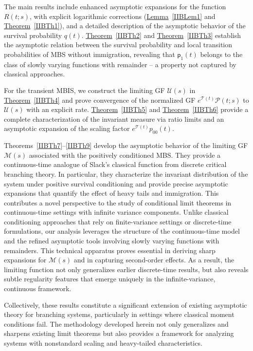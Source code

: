 \documentclass[10pt,reqno]{amsart}
\theoremstyle{definition}
\numberwithin{equation}{section}
\begin{document}
    The main results include enhanced asymptotic expansions for the function $R(t;s)$, with explicit logarithmic
    corrections ({\hyperref[IIBLem1]{Lemma}~\ref{IIBLem1}} and {\hyperref[IIBTh1]{Theorem}~\ref{IIBTh1}}), and
    a detailed description of the asymptotic behavior of the survival probability $q(t)$.
    {\hyperref[IIBTh2]{Theorem}~\ref{IIBTh2}} and {\hyperref[IIBTh3]{Theorem}~\ref{IIBTh3}} establish the
    asymptotic relation between the survival probability and local transition probabilities of MBS without
    immigration, revealing that $\textsf{p}_1(t)$ belongs to the class of slowly varying functions with
    remainder -- a property not captured by classical approaches.

    For the transient MBIS, we construct the limiting GF $\mathcal{U}(s)$ in {\hyperref[IIBTh4]{Theorem}~\ref{IIBTh4}}
    and prove convergence of the normalized GF $e^{\mathcal{T}(t)}\mathcal{P}(t;s)$ to $\mathcal{U}(s)$ with
    an explicit rate. {\hyperref[IIBTh5]{Theorem}~\ref{IIBTh5}} and {\hyperref[IIBTh6]{Theorem}~\ref{IIBTh6}}
    provide a complete characterization of the invariant measure via ratio limits and an asymptotic
    expansion of the scaling factor $e^{\mathcal{T}(t)} p_{00}(t)$.

    Theorems~\ref{IIBTh7}--\ref{IIBTh9} develop the asymptotic behavior of the limiting
    GF $\mathcal{M}(s)$ associated with the positively conditioned MBS. They provide a continuous-time
    analogue of Slack's classical function from discrete critical branching theory. In particular, they characterize
    the invariant distribution of the system under positive survival conditioning and provide precise asymptotic
    expansions that quantify the effect of heavy tails and immigration. This contributes a novel perspective to
    the study of conditional limit theorems in continuous-time settings with infinite variance components.
    Unlike classical conditioning approaches that rely on finite-variance settings or discrete-time formulations,
    our analysis leverages the structure of the continuous-time model and the refined asymptotic tools involving
    slowly varying functions with remainders. This technical apparatus proves essential in deriving sharp expansions
    for $\mathcal{M}(s)$ and in capturing second-order effects. As a result, the limiting function not only
    generalizes earlier discrete-time results, but also reveals subtle regularity features that emerge uniquely
    in the infinite-variance, continuous framework.

    Collectively, these results constitute a significant extension of existing asymptotic theory for
    branching systems, particularly in settings where classical moment conditions fail. The methodology
    developed herein not only generalizes and sharpens existing limit theorems but also provides a framework
    for analyzing systems with nonstandard scaling and heavy-tailed characteristics.
\end{document}
